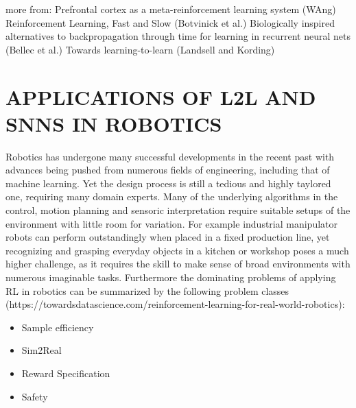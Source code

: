 \documentclass[letterpaper, 10 pt, conference]{ieeeconf}  %
\begin{document}
more from: \newline
Prefrontal cortex as a meta-reinforcement learning system (WAng)
Reinforcement Learning, Fast and Slow (Botvinick et al.) \newline
Biologically inspired alternatives to backpropagation through time for learning in recurrent neural nets (Bellec et al.) \newline
Towards learning-to-learn (Landsell and Kording) \newline

\section{APPLICATIONS OF L2L AND SNNS IN ROBOTICS}

Robotics has undergone many successful developments in the recent past with advances being pushed from 
numerous fields of engineering, including that of machine learning. Yet the design process is still a tedious and 
highly taylored one, requiring many domain experts. Many of the underlying algorithms in 
the control, motion planning and sensoric interpretation require suitable setups of the environment with little room
for variation. For example industrial manipulator robots can perform outstandingly when placed in a fixed production line, yet 
recognizing and grasping everyday objects in a kitchen or workshop poses a much higher challenge, as it requires the skill to 
make sense of broad environments with numerous imaginable tasks. Furthermore the dominating problems of applying RL in 
robotics can be summarized by the following problem classes (https://towardsdatascience.com/reinforcement-learning-for-real-world-robotics):

\begin{itemize}
        \item Sample efficiency
        \item Sim2Real
        \item Reward Specification
        \item Safety
\end{itemize}   
\end{document}
